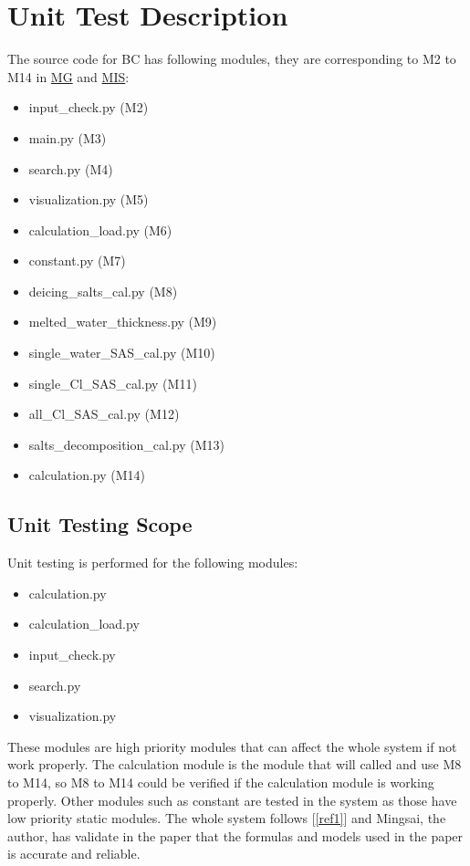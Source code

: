 \documentclass[12pt, titlepage]{article}
\newcommand{\reref}[1]{\ref{#1}}
\begin{document}

\section{Unit Test Description}\label{UTD}
The source code for BC has following modules, they are corresponding to M2 to M14 in \href{https://github.com/CynthiaLiu0805/BridgeCorrosion/blob/main/docs/Design/SoftArchitecture/MG.pdf}{MG} and \href{https://github.com/CynthiaLiu0805/BridgeCorrosion/blob/main/docs/Design/SoftDetailedDes/MIS.pdf}{MIS}:
\begin{itemize}
\item input\_check.py (M2)
\item main.py (M3)
\item search.py (M4)
\item visualization.py (M5)
\item calculation\_load.py (M6)
\item constant.py (M7)
\item deicing\_salts\_cal.py (M8)
\item melted\_water\_thickness.py (M9)
\item single\_water\_SAS\_cal.py (M10)
\item single\_Cl\_SAS\_cal.py (M11)
\item all\_Cl\_SAS\_cal.py (M12)
\item salts\_decomposition\_cal.py (M13)
\item calculation.py (M14)
\end{itemize}

\subsection{Unit Testing Scope}
Unit testing is performed for the following modules:
\begin{itemize}
\item calculation.py
\item calculation\_load.py
\item input\_check.py
\item search.py
\item visualization.py
\end{itemize}

These modules are high priority modules that can affect the whole system if not work properly. The calculation module is the module that will called and use M8 to M14, so M8 to M14 could be verified if the calculation module is working properly. Other modules such as constant are tested in the system as those
have low priority static modules.
The whole system follows [\reref{ref1}] and Mingsai, the author, has validate in the paper that the formulas and models used in the paper is accurate and reliable. 
\end{document}
